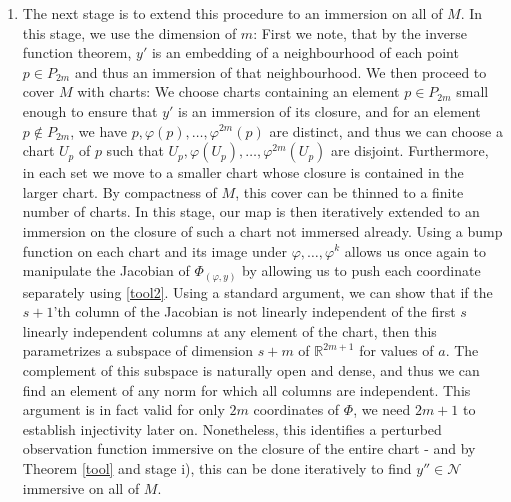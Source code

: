 \documentclass[11pt, a4paper]{memoir}
\theoremstyle{break}
\theoremstyle{break}
\theoremstyle{nonumberplain}
\newcommand{\mR}{\mathbb{R}}
\begin{document}
\begin{enumerate}[label=\roman*)]
	\item The next stage is to extend this procedure to an immersion on all of $M$. In this stage, we use the dimension of $m$: First we note, that by the inverse function theorem, $y'$ is an embedding of a neighbourhood of each point $p\in P_{2m}$ and thus an immersion of that neighbourhood. We then proceed to cover $M$ with charts:  We choose charts containing an element $p\in P_{2m}$ small enough to ensure that $y'$ is an immersion of its closure, and for an element $p\notin P_{2m}$, we have $p,\varphi(p),\ldots, \varphi^{2m}(p)$ are distinct, and thus we can choose a chart $U_p$ of $p$ such that $U_p,\varphi(U_p),\ldots, \varphi^{2m}(U_p)$ are disjoint. Furthermore, in each set we move to a smaller chart whose closure is contained in the larger chart. By compactness of $M$, this cover can be thinned to a finite number of charts. In this stage, our map is then iteratively extended to an immersion on the closure of such a chart not immersed already. Using a bump function on each chart and its image under $\varphi,\ldots,\varphi^k$ allows us once again to manipulate the Jacobian of $\Phi_{(\varphi,y)}$ by allowing us to push  each coordinate separately using \ref{tool2}. Using a standard argument, we can show that if the $s+1$'th column of the Jacobian is not linearly independent of the first $s$ linearly independent columns at any element of the chart, then this parametrizes a subspace of dimension $s+m$ of $\mR^{2m+1}$ for values of $a$.  The complement of this subspace is naturally open and dense, and thus we can find an element of any norm for which all columns are independent. This argument is in fact valid for only $2m$ coordinates of $\Phi$, we need $2m+1$ to establish injectivity later on. Nonetheless, this identifies a perturbed observation function immersive on the closure of the entire chart - and by Theorem \ref{tool} and stage i), this can be done iteratively to find $y''\in \mathcal{N}$ immersive on all of $M$.

\end{enumerate}
\end{document}
